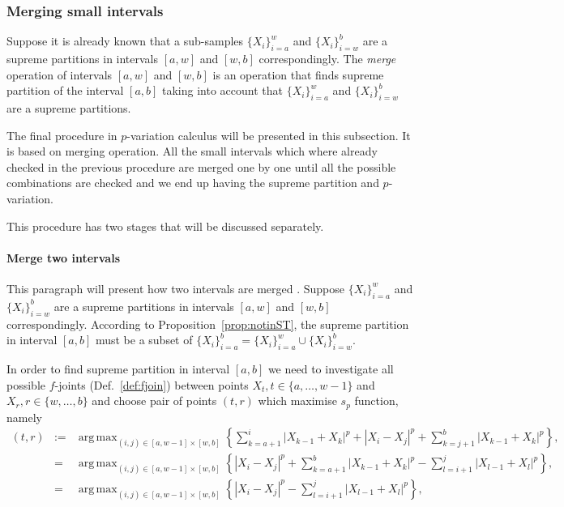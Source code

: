 \documentclass[12pt, a4paper]{article}
\DeclareMathOperator*{\argmax}{arg\,max}
\numberwithin{equation}{section}
\begin{document}



\subsubsection{Merging small intervals}
\label{sec:meging}

Suppose it is already known that 
a sub-samples $\{X_{i}\}_{i=a}^{w}$  and $\{X_{i}\}_{i=w}^{b}$
are a supreme partitions in intervals $[a,w]$ and $[w,b]$ correspondingly. 
The \emph{merge} operation of intervals $[a,w]$ and $[w,b]$ is
an operation that finds supreme partition 
of the interval $[a,b]$ taking into account
that  $\{X_{i}\}_{i=a}^{w}$  and $\{X_{i}\}_{i=w}^{b}$
are a supreme partitions.

The final procedure in $p$-variation calculus will be
presented in this subsection. It is based on
merging operation.
All the small intervals which where already checked in the 
previous procedure are merged one by one until all the
possible combinations are checked and we end up having
the supreme partition and $p$-variation.

This procedure has two stages that will be discussed separately.

\paragraph{Merge two intervals}

This paragraph will present how two intervals are merged .
Suppose $\{X_{i}\}_{i=a}^{w}$  and $\{X_{i}\}_{i=w}^{b}$
are a supreme partitions in intervals $[a,w]$ and $[w,b]$ correspondingly. 
According to Proposition~\ref{prop:notinST},
the supreme partition in interval $[a, b]$ must
be a subset of 
$\{X_{i}\}_{i=a}^{b} = \{X_{i}\}_{i=a}^{w} \cup \{X_{i}\}_{i=w}^{b}$.
 
In order to find supreme partition in interval $[a,b]$
we need to investigate all possible
$f$-joints (Def.~\ref{def:fjoin}) between points $X_t, t\in \{a,\dots,w-1\}$ and
$X_r, r\in \{w,\dots,b\}$ and choose pair of points
$(t, r)$ which maximise $s_p$ function, namely  
\begin{eqnarray}
  (t, r) &:=& \argmax_{(i,j) \in [a, w-1] \times [w, b] } 
    \left\{ \sum_{k=a+1}^i |X_{k-1} + X_{k}|^p + |X_i-X_j|^p 
    + \sum_{k=j+1}^b |X_{k-1} + X_{k}|^p \right\}, \nonumber \\
  &=& \argmax_{(i,j) \in [a, w-1] \times [w, b] }  
    \left\{|X_i-X_j|^p +  \sum_{k=a+1}^b |X_{k-1} + X_{k}|^p  
    - \sum_{l=i+1}^j |X_{l-1} + X_{l}|^p  \right\}, \nonumber \\
   \label{eq:tr_argmax}  
   &=& \argmax_{(i,j) \in [a, w-1] \times [w, b] }  
    \left\{|X_i-X_j|^p - \sum_{l=i+1}^j |X_{l-1} + X_{l}|^p  \right\},   
\end{eqnarray}
\end{document}
